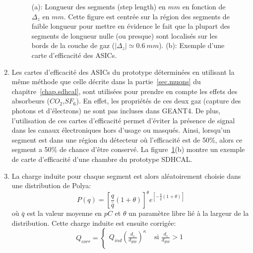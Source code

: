 \begin{enumerate}[~~1-]
\begin{figure}[!ht]
    \caption{(a): Longueur des segments (step length) en $mm$ en fonction de $\Delta_z$ en $mm$. Cette figure est centrée sur la région des segments de faible longueur pour mettre en évidence le fait que la plupart des segments de longueur nulle (ou presque) sont localisés sur les bords de la couche de gaz ($|\Delta_z|\simeq0.6\ mm$). (b): Exemple d'une carte d'efficacité des ASICs.}
    \label{fig.map_and_length_vs_deltaz}
  \end{figure}
\item Les cartes d'efficacité des ASICs du prototype déterminées en utilisant la même méthode que celle décrite dans la partie~\ref{sec.muons} du chapitre~\ref{chap.sdhcal}, sont utilisées pour prendre en compte les effets des absorbeurs ($CO_2$,$SF_6$). En effet, les propriétés de ces deux gaz (capture des photons et d'électrons) ne sont pas incluses dans GEANT4. De plus, l'utilisation de ces cartes d’efficacité permet d'éviter la présence de signal dans les canaux électroniques hors d'usage ou masqués. Ainsi, lorsqu'un segment est dans une région du détecteur où l'efficacité est de 50\%, alors ce segment a 50\% de chance d'être conservé. La figure~\ref{fig.map_and_length_vs_deltaz}(b) montre un exemple de carte d'efficacité d'une chambre du prototype SDHCAL.
\item La charge induite pour chaque segment est alors aléatoirement choisie dans une distribution de Polya: 
  \begin{equation}
    \label{eq.polya}
    P(q)=[\frac{q}{\bar q}(1+\theta)]^{\theta}e^{[-\frac{q}{\bar q}(1+\theta)]}
  \end{equation}
  où $\bar q$ est la valeur moyenne en $pC$ et $\theta$ un paramètre libre lié à la largeur de la distribution. Cette charge induite est ensuite corrigée: 
  \begin{equation}
    \label{eq.lengthcorrection}
    Q_{corr} = \left\{ \begin{array}{rl}
      Q_{ind}(\frac{d_s}{d_{gap}})^\kappa &\mbox{ si $\frac{d_s}{d_{gap}}>1$} \\

\end{array}
\end{equation}
\end{enumerate}
